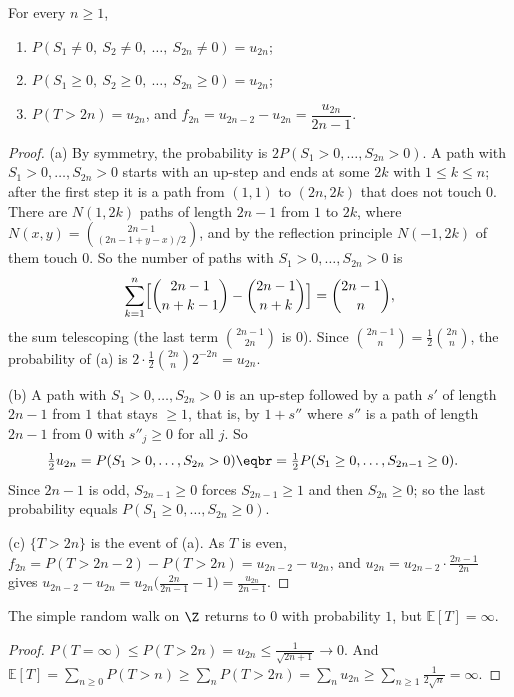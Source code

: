 \begin{theorem}\label{thm:mainlemma}
For every $n\ge1$,
\begin{enumerate}
\item[(a)] $P(S_1\ne0,\ S_2\ne0,\ \dots,\ S_{2n}\ne0)=u_{2n}$;
\item[(b)] $P(S_1\ge0,\ S_2\ge0,\ \dots,\ S_{2n}\ge0)=u_{2n}$;
\item[(c)] $P(T>2n)=u_{2n}$, and $f_{2n}=u_{2n-2}-u_{2n}=\dfrac{u_{2n}}{2n-1}$.
\end{enumerate}
\end{theorem}
\begin{proof}
(a) By symmetry, the probability is $2P(S_1>0,\dots,S_{2n}>0)$. A path with $S_1>0,\dots,S_{2n}>0$ starts with an up-step and
ends at some $2k$ with $1\le k\le n$; after the first step it is a path from $(1,1)$ to $(2n,2k)$ that does not touch $0$.
There are $N(1,2k)$ paths of length $2n-1$ from $1$ to $2k$, where $N(x,y)=\binom{2n-1}{(2n-1+y-x)/2}$, and by the reflection
principle $N(-1,2k)$ of them touch $0$. So the number of paths with $S_1>0,\dots,S_{2n}>0$ is
\[
\sum_{k=1}^n\Bigl[\binom{2n-1}{n+k-1}-\binom{2n-1}{n+k}\Bigr]=\binom{2n-1}n,
\]
the sum telescoping (the last term $\binom{2n-1}{2n}$ is $0$). Since $\binom{2n-1}n=\frac12\binom{2n}n$, the probability of (a) is $2\cdot\frac12\binom{2n}n2^{-2n}=u_{2n}$.

(b) A path with $S_1>0,\dots,S_{2n}>0$ is an up-step followed by a path $s'$ of length $2n-1$ from $1$ that stays $\ge1$,
that is, by $1+s''$ where $s''$ is a path of length $2n-1$ from $0$ with $s''_j\ge0$ for all $j$. So
\[
\begin{aligned}\tfrac12u_{2n}&=P(S_1>0,\dots,S_{2n}>0)\eqbr=\tfrac12P(S_1\ge0,\dots,S_{2n-1}\ge0).\end{aligned}
\]
Since $2n-1$ is odd, $S_{2n-1}\ge0$ forces $S_{2n-1}\ge1$ and then $S_{2n}\ge0$; so the last probability equals $P(S_1\ge0,\dots,S_{2n}\ge0)$.

(c) $\{T>2n\}$ is the event of (a). As $T$ is even, $f_{2n}=P(T>2n-2)-P(T>2n)=u_{2n-2}-u_{2n}$, and $u_{2n}=u_{2n-2}\cdot\frac{2n-1}{2n}$
gives $u_{2n-2}-u_{2n}=u_{2n}\bigl(\frac{2n}{2n-1}-1\bigr)=\frac{u_{2n}}{2n-1}$.
\end{proof}

\begin{corollary}\label{cor:return1d}
The simple random walk on $\Z$ returns to $0$ with probability $1$, but $\mathbb E[T]=\infty$.
\end{corollary}
\begin{proof}
$P(T=\infty)\le P(T>2n)=u_{2n}\le\frac1{\sqrt{2n+1}}\to0$. And $\mathbb E[T]=\sum_{n\ge0}P(T>n)\ge\sum_nP(T>2n)=\sum_nu_{2n}\ge\sum_{n\ge1}\frac1{2\sqrt n}=\infty$.
\end{proof}

